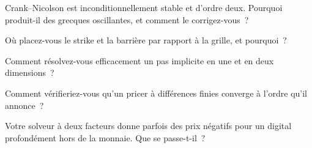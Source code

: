 \begin{interviewq}\label{iq:qm:finite-difference-methods:2}
Crank--Nicolson est inconditionnellement stable et d'ordre deux. Pourquoi produit-il des grecques oscillantes, et comment le corrigez-vous~?
\end{interviewq}

\begin{interviewq}\label{iq:qm:finite-difference-methods:3}
Où placez-vous le strike et la barrière par rapport à la grille, et pourquoi~?
\end{interviewq}

\begin{interviewq}\label{iq:qm:finite-difference-methods:4}
Comment résolvez-vous efficacement un pas implicite en une et en deux dimensions~?
\end{interviewq}

\begin{interviewq}\label{iq:qm:finite-difference-methods:5}
Comment vérifieriez-vous qu'un pricer à différences finies converge à l'ordre qu'il annonce~?
\end{interviewq}

\begin{interviewq}\label{iq:qm:finite-difference-methods:6}
Votre solveur à deux facteurs donne parfois des prix négatifs pour un digital profondément hors de la monnaie. Que se passe-t-il~?
\end{interviewq}
